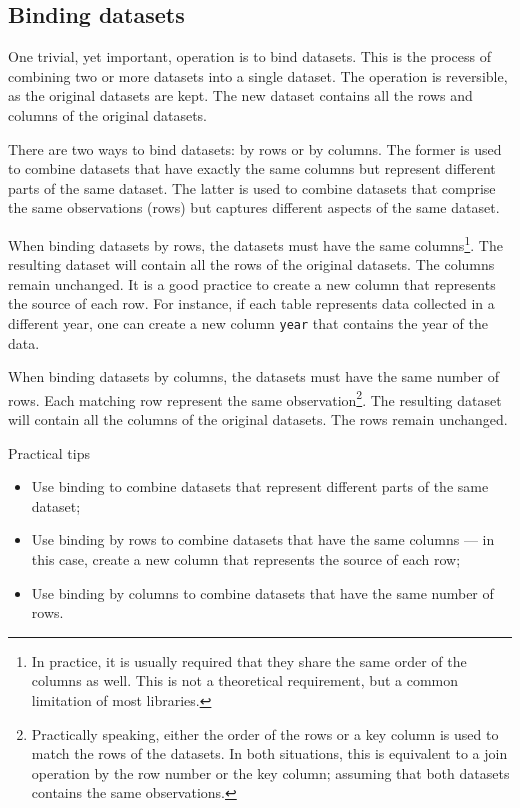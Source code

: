 \subsection{Binding datasets}

One trivial, yet important, operation is to bind datasets.  This is the process of
combining two or more datasets into a single dataset.  The operation is reversible, as the
original datasets are kept.  The new dataset contains all the rows and columns of the
original datasets.

There are two ways to bind datasets: by rows or by columns.  The former is used to
combine datasets that have exactly the same columns but represent different parts of the
same dataset.  The latter is used to combine datasets that comprise the same observations
(rows) but captures different aspects of the same dataset.

When binding datasets by rows, the datasets must have the same columns\footnote{In
practice, it is usually required that they share the same order of the columns as well.
This is not a theoretical requirement, but a common limitation of most libraries.}.
The resulting dataset will contain all the rows of the original datasets.  The columns
remain unchanged.  It is a good practice to create a new column that represents the source
of each row.  For instance, if each table represents data collected in a different year,
one can create a new column \texttt{year} that contains the year of the data.

When binding datasets by columns, the datasets must have the same number of rows.  Each
matching row represent the same observation\footnote{Practically speaking, either the
order of the rows or a key column is used to match the rows of the datasets.  In both
situations, this is equivalent to a join operation by the row number or the key column;
assuming that both datasets contains the same observations.}. The resulting dataset will
contain all the columns of the original datasets.  The rows remain unchanged.

\begin{hlbox}{Practical tips}
  \begin{itemize}
    \item Use binding to combine datasets that represent different parts of the same dataset;
    \item Use binding by rows to combine datasets that have the same columns --- in this
      case, create a new column that represents the source of each row;
    \item Use binding by columns to combine datasets that have the same number of rows.
  \end{itemize}
\end{hlbox}

